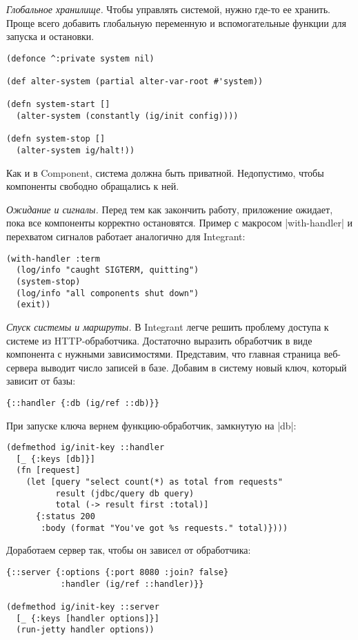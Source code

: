 \emph{Глобальное хранилище.} Чтобы управлять системой, нужно где-то ее
хранить. Проще всего добавить глобальную переменную и вспомогательные функции
для запуска и остановки.

\begin{verbatim}
(defonce ^:private system nil)

(def alter-system (partial alter-var-root #'system))

(defn system-start []
  (alter-system (constantly (ig/init config))))

(defn system-stop []
  (alter-system ig/halt!))
\end{verbatim}

Как и в Component, система должна быть приватной. Недопустимо, чтобы компоненты
свободно обращались к ней.

\emph{Ожидание и сигналы.} Перед тем как закончить работу, приложение ожидает, пока
все компоненты корректно остановятся. Пример с макросом \spverb|with-handler| и
перехватом сигналов работает аналогично для Integrant:

\begin{verbatim}
(with-handler :term
  (log/info "caught SIGTERM, quitting")
  (system-stop)
  (log/info "all components shut down")
  (exit))
\end{verbatim}

\emph{Спуск системы и маршруты.} В Integrant легче решить проблему доступа к
системе из HTTP-обработчика. Достаточно выразить обработчик в виде компонента с
нужными зависимостями. Представим, что главная страница веб-сервера выводит
число записей в базе. Добавим в систему новый ключ, который зависит от базы:

\begin{verbatim}
{::handler {:db (ig/ref ::db)}}
\end{verbatim}

При запуске ключа вернем функцию-обработчик, замкнутую на \spverb|db|:

\begin{verbatim}
(defmethod ig/init-key ::handler
  [_ {:keys [db]}]
  (fn [request]
    (let [query "select count(*) as total from requests"
          result (jdbc/query db query)
          total (-> result first :total)]
      {:status 200
       :body (format "You've got %s requests." total)})))
\end{verbatim}

Доработаем сервер так, чтобы он зависел от обработчика:

\begin{verbatim}
{::server {:options {:port 8080 :join? false}
           :handler (ig/ref ::handler)}}

(defmethod ig/init-key ::server
  [_ {:keys [handler options]}]
  (run-jetty handler options))
\end{verbatim}

